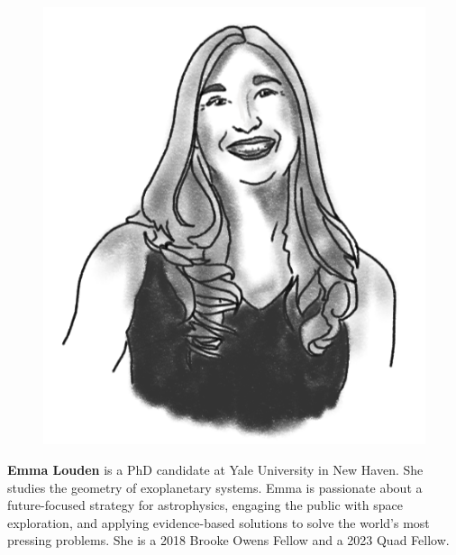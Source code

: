 \begin{figure}
\vspace{-\intextsep}
\includegraphics[width=0.9\linewidth]{portraits/emma.png}
\end{figure}
\textbf{Emma Louden} is a PhD candidate at Yale University in New Haven. She studies the geometry of exoplanetary systems. Emma is passionate about a future-focused strategy for astrophysics, engaging the public with space exploration, and applying evidence-based solutions to solve the world’s most pressing problems. She is a 2018 Brooke Owens Fellow and a 2023 Quad Fellow.
\\
\\

\strut \vspace{-50pt}

